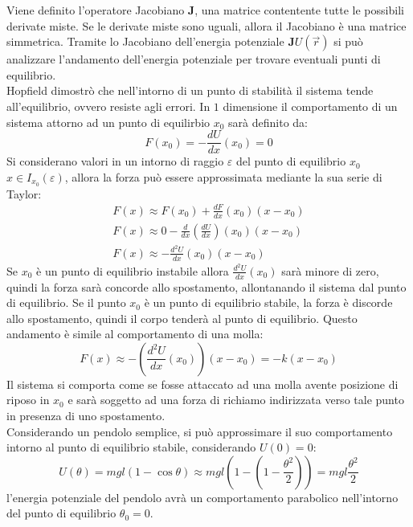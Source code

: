 \documentclass{article}
\numberwithin{equation}{subsection}
\begin{document}
Viene definito l'operatore Jacobiano $\mathbf{J}$, una matrice contentente tutte 
le possibili derivate miste. Se le derivate miste sono uguali, 
allora il Jacobiano è una matrice simmetrica. Tramite lo 
Jacobiano dell'energia potenziale $\mathbf{J}U(\vec{r})$ si può analizzare l'andamento dell'energia potenziale per trovare eventuali punti di equilibrio. 
\\
Hopfield dimostrò che nell'intorno di un punto di stabilità 
il sistema tende all'equilibrio, ovvero resiste agli errori. 
In $1$ dimensione il comportamento di un sistema attorno ad un 
punto di equilirbio $x_0$ sarà definito da:
\begin{equation}
    F(x_0)=-\displaystyle\frac{dU}{dx}(x_0)=0
\end{equation}
Si considerano valori in un intorno di raggio $\varepsilon$ del punto di equilibrio $x_0$ $x\in I_{x_0}(\varepsilon)$, allora la forza può 
essere approssimata mediante la sua serie di Taylor:
\begin{gather*}
    F(x)\approx F(x_0)+\displaystyle\frac{dF}{dx}(x_0)(x-x_0)\\
    F(x)\approx 0-\displaystyle\frac{d}{dx}\left(\frac{dU}{dx}\right)(x_0)(x-x_0)\\
    F(x)\approx -\displaystyle\frac{d^{2}U}{dx}(x_0)(x-x_0)
\end{gather*}
Se $x_0$ è un punto di equilibrio instabile allora $\displaystyle\frac{d^{2}U}{dx}(x_0)$ 
sarà minore di zero, quindi la forza sarà concorde allo 
spostamento, allontanando il sistema dal punto di equilibrio. 
Se il punto $x_0$ è un punto di equilibrio stabile, 
la forza è discorde allo spostamento, quindi 
il corpo tenderà al punto di equilibrio. Questo andamento  
è simile al comportamento di una molla:
\begin{equation}
    F(x)\approx -\left(\displaystyle\frac{d^{2}U}{dx}(x_0)\right)(x-x_0)=-k(x-x_0)
\end{equation}
Il sistema si comporta come se fosse attaccato ad una molla avente 
posizione di riposo in $x_0$ e sarà soggetto ad una forza di 
richiamo indirizzata verso tale punto in presenza di uno 
spostamento. 
\\
Considerando un pendolo semplice, si può approssimare il suo comportamento intorno al punto di equilibrio stabile, considerando $U(0)=0$: 
\begin{equation*}
    U(\theta) = mgl(1-\cos\theta)\approx mgl\left(1-\left(1-\displaystyle\frac{\theta^{2}}{2}\right)\right)=mgl\frac{\theta^2}{2}
\end{equation*}
l'energia potenziale del pendolo avrà un comportamento parabolico 
nell'intorno del punto di equilibrio $\theta_0=0$.
\end{document}

